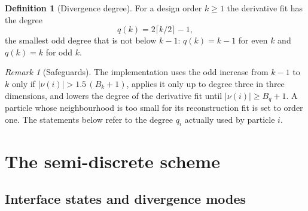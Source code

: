 \documentclass[11pt,a4paper]{article}
\theoremstyle{plain}
\theoremstyle{definition}
\newtheorem{definition}[theorem]{Definition}
\theoremstyle{remark}
\newtheorem{remark}[theorem]{Remark}
\numberwithin{equation}{section}
\newcommand{\nb}{\nu}
\newcommand{\qdiv}{q}
\begin{document}
\begin{definition}[Divergence degree]\label{def:qk}
For a design order $k\ge1$ the derivative fit has the degree
\begin{equation}\label{eq:qk}
\qdiv(k) = 2\lceil k/2\rceil - 1,
\end{equation}
the smallest odd degree that is not below $k-1$: $\qdiv(k)=k-1$ for even $k$ and $\qdiv(k)=k$ for odd $k$.
\end{definition}

\begin{remark}[Safeguards]\label{rem:safeguards}
The implementation uses the odd increase from $k-1$ to $k$ only if $|\nb(i)|>1.5\,(B_k+1)$, applies it only up to degree three in three dimensions, and lowers the degree of the derivative fit until $|\nb(i)|\ge B_q+1$. A particle whose neighbourhood is too small for its reconstruction fit is set to order one. The statements below refer to the degree $q_i$ actually used by particle $i$.
\end{remark}

\section{The semi-discrete scheme}\label{sec:muscl}

\subsection{Interface states and divergence modes}\label{sec:states}
\end{document}
